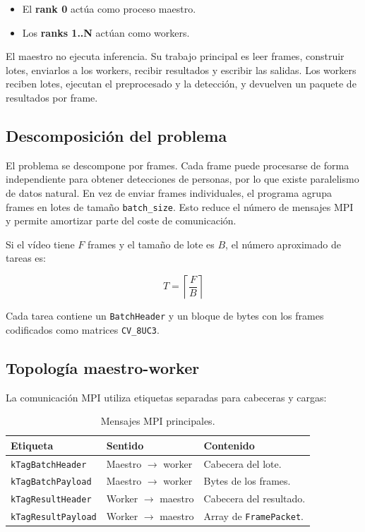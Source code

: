 \documentclass[12pt,a4paper]{article}
\begin{document}
\begin{itemize}
    \item El \textbf{rank 0} act\'ua como proceso maestro.
    \item Los \textbf{ranks 1..N} act\'uan como workers.
\end{itemize}

El maestro no ejecuta inferencia. Su trabajo principal es leer frames, construir lotes,
enviarlos a los workers, recibir resultados y escribir las salidas. Los workers reciben
lotes, ejecutan el preprocesado y la detecci\'on, y devuelven un paquete de resultados por
frame.

\subsection{Descomposici\'on del problema}

El problema se descompone por frames. Cada frame puede procesarse de forma independiente
para obtener detecciones de personas, por lo que existe paralelismo de datos natural. En vez
de enviar frames individuales, el programa agrupa frames en lotes de tama\~no
\texttt{batch\_size}. Esto reduce el n\'umero de mensajes MPI y permite amortizar parte del
coste de comunicaci\'on.

Si el v\'ideo tiene $F$ frames y el tama\~no de lote es $B$, el n\'umero aproximado de tareas es:

\[
    T = \left\lceil \frac{F}{B} \right\rceil
\]

Cada tarea contiene un \texttt{BatchHeader} y un bloque de bytes con los frames codificados
como matrices \texttt{CV\_8UC3}.

\subsection{Topolog\'ia maestro-worker}

La comunicaci\'on MPI utiliza etiquetas separadas para cabeceras y cargas:

\begin{table}[H]
\centering
\begin{tabular}{lll}
\toprule
\textbf{Etiqueta} & \textbf{Sentido} & \textbf{Contenido} \\
\midrule
\texttt{kTagBatchHeader} & Maestro $\rightarrow$ worker & Cabecera del lote. \\
\texttt{kTagBatchPayload} & Maestro $\rightarrow$ worker & Bytes de los frames. \\
\texttt{kTagResultHeader} & Worker $\rightarrow$ maestro & Cabecera del resultado. \\
\texttt{kTagResultPayload} & Worker $\rightarrow$ maestro & Array de \texttt{FramePacket}. \\
\bottomrule
\end{tabular}
\caption{Mensajes MPI principales.}
\end{table}
\end{document}
